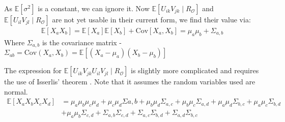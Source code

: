 As $\mathbb{E}[\sigma^2]$ is a constant, we can ignore it. Now $\mathbb{E}[U_{ik}V_{jk} \mid R_\mathcal{O}]$ and $\mathbb{E}[U_{il}V_{jl} \mid R_\mathcal{O}]$ are not yet usable in their current form, we find their value via:
\begin{align*}
\mathbb{E}[X_a X_b] = \mathbb{E}[X_a] \mathbb{E}[X_b] + \mathrm{Cov}[X_a, X_b] = \mu_a\mu_b + \Sigma_{a,b}
\end{align*}
Where $\Sigma_{a,b}$ is the covariance matrix -  $\Sigma_{ab}= \mathrm{Cov}(X_a, X_b) = \mathbb{E}\left[
(X_a - \mu_a)(X_b - \mu_b)\right]$

The expression for $\mathbb{E}[U_{ik}V_{jk}U_{il}V_{jl} \mid R_\mathcal{O}]$ is slightly more complicated and requires the use of Isserlis' theorem \cite{isserlis1918}. Note that it assumes the random variables used are normal. 
\begin{align*}
\mathbb{E}[X_aX_bX_cX_d] &= \mu_a\mu_b\mu_c\mu_d +\mu_c\mu_d\Sigma{a,b}+\mu_b\mu_d\Sigma_{a,c}+\mu_b\mu_c\Sigma_{a,d}+\mu_a\mu_d\Sigma_{b,c}+\mu_a\mu_c\Sigma_{b,d}\\
&+\mu_a\mu_b\Sigma_{c,d} + \Sigma_{a,b}\Sigma_{c,d} + \Sigma_{a,c}\Sigma_{b,d} + \Sigma_{a,d}\Sigma_{b,c}
\end{align*}

